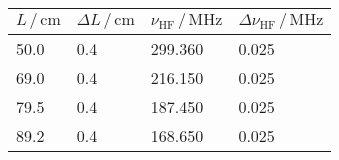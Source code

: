 \begin{tabular}{@{}llll@{}}
\toprule
  {$L \, / \, \si{\centi\metre}$} & {$\Delta L \, / \, \si{\centi\metre}$} & {$\nu_\mathrm{HF} \, / \, \si{\mega\hertz}$} & {$\Delta \nu_\mathrm{HF} \, / \, \si{\mega\hertz}$} \\
  \midrule
  50.0 & 0.4 & 299.360 & 0.025 \\ 
  69.0 & 0.4 & 216.150 & 0.025 \\
  79.5 & 0.4 & 187.450 & 0.025 \\
  89.2 & 0.4 & 168.650 & 0.025 \\
  \bottomrule
\end{tabular}